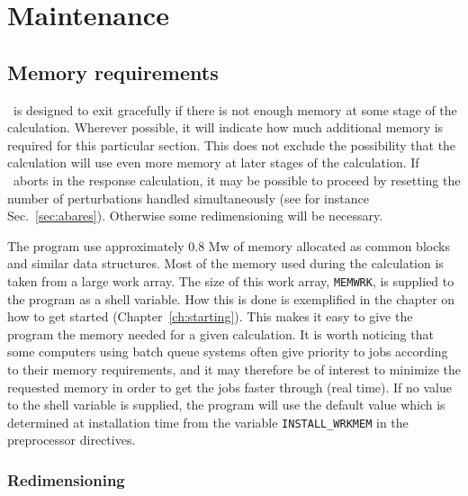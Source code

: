 \chapter{Maintenance}\label{ch:maintain}

\section{Memory requirements}

\siraba\ is designed to exit gracefully if there is
not enough memory at some stage of the calculation.  Wherever
possible, it will indicate how much additional memory is required for this
particular section.  This does not exclude the possibility that the
calculation will use even more memory at later stages of the
calculation. If \siraba\ aborts in the response calculation, it may be
possible to proceed by resetting the number of perturbations handled
simultaneously (see for instance Sec.~\ref{sec:abares}).  Otherwise some 
redimensioning will be necessary.

The program use approximately 0.8 Mw of memory allocated as common
blocks and similar data structures. Most of the memory used during the
calculation is taken from a large work array. The size of this work
array,
\verb|MEMWRK|, is supplied to the program as a shell
variable. How this is done is 
exemplified in the chapter on how to get started
(Chapter~\ref{ch:starting}). This makes it easy 
to give the program the memory needed for a given calculation. It is
worth noticing that some computers using batch queue systems often
give priority to jobs according to their memory requirements, and it may
therefore be of interest to minimize the requested memory in order to
get the jobs faster through (real time). If no value to the shell
variable is supplied, the program will use the  default value which is
determined at installation time from the variable
\verb|INSTALL_WRKMEM| in the preprocessor
directives. 

\subsection{Redimensioning  \siraba}

